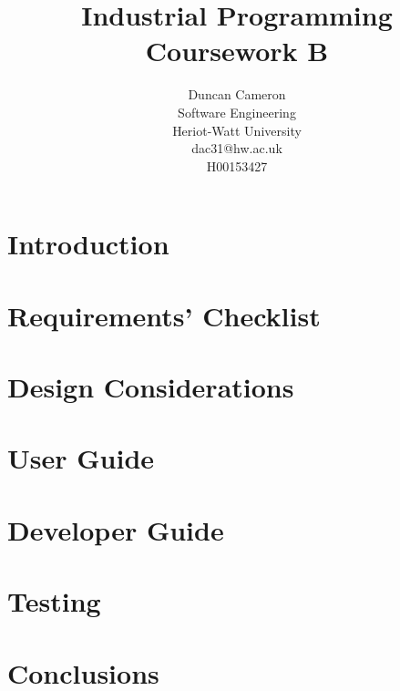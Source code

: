 \documentclass[11pt]{report}
\begin{document}
\title{Industrial Programming Coursework B}
\author{Duncan Cameron \\
Software Engineering \\
Heriot-Watt University \\
dac31@hw.ac.uk\\
H00153427}
\maketitle



\chapter{Introduction}
\chapter{Requirements' Checklist}
\chapter{Design Considerations}
\chapter{User Guide}
\chapter{Developer Guide}
\chapter{Testing}
\chapter{Conclusions}
\end{document}
